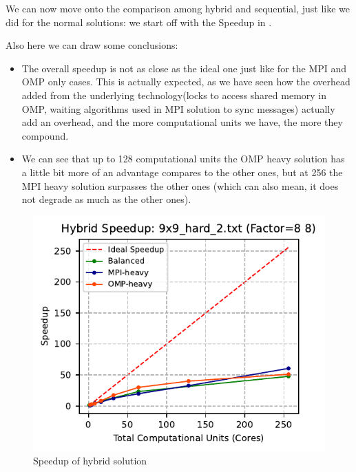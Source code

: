 We can now move onto the comparison among hybrid and sequential, just like we did for the normal solutions: we start off with the Speedup in .

Also here we can draw some conclusions:
\begin{itemize}
    \item The overall speedup is not as close as the ideal one just like for the MPI and OMP only cases. This is actually expected, as we have seen how the overhead added from the underlying technology(locks to access shared memory in OMP, waiting algorithms used in MPI solution to sync messages) actually add an overhead, and the more computational units we have, the more they compound.
    \item We can see that up to 128 computational units the OMP heavy solution has a little bit more of an advantage compares to the other ones, but at 256 the MPI heavy solution surpasses the other ones (which can also mean, it does not degrade as much as the other ones).
\end{itemize}


\begin{figure}[htbp]
\centering
\includegraphics[width=0.9\linewidth]{imgs/speedup_hybrid_9x9_hard_2.pdf}
\caption{Speedup of hybrid solution}
\label{fig:speedup_hybrid}
\end{figure}


